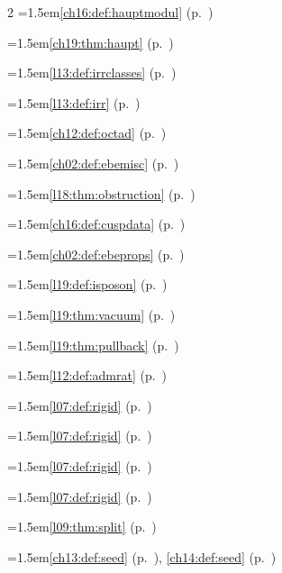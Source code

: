 \begin{multicols}{2}
\hangindent=1.5em\quad \ref{ch16:def:hauptmodul} (p.~\pageref{ch16:def:hauptmodul})\par
\hangindent=1.5em\quad \ref{ch19:thm:haupt} (p.~\pageref{ch19:thm:haupt})\par
\hangindent=1.5em\quad \ref{l13:def:irrclasses} (p.~\pageref{l13:def:irrclasses})\par
\hangindent=1.5em\quad \ref{l13:def:irr} (p.~\pageref{l13:def:irr})\par
\hangindent=1.5em\quad \ref{ch12:def:octad} (p.~\pageref{ch12:def:octad})\par
\hangindent=1.5em\quad \ref{ch02:def:ebemisc} (p.~\pageref{ch02:def:ebemisc})\par
\hangindent=1.5em\quad \ref{l18:thm:obstruction} (p.~\pageref{l18:thm:obstruction})\par
\hangindent=1.5em\quad \ref{ch16:def:cuspdata} (p.~\pageref{ch16:def:cuspdata})\par
\hangindent=1.5em\quad \ref{ch02:def:ebeprops} (p.~\pageref{ch02:def:ebeprops})\par
\hangindent=1.5em\quad \ref{l19:def:isposon} (p.~\pageref{l19:def:isposon})\par
\hangindent=1.5em\quad \ref{l19:thm:vacuum} (p.~\pageref{l19:thm:vacuum})\par
\hangindent=1.5em\quad \ref{l19:thm:pullback} (p.~\pageref{l19:thm:pullback})\par
\hangindent=1.5em\quad \ref{l12:def:admrat} (p.~\pageref{l12:def:admrat})\par
\hangindent=1.5em\quad \ref{l07:def:rigid} (p.~\pageref{l07:def:rigid})\par
\hangindent=1.5em\quad \ref{l07:def:rigid} (p.~\pageref{l07:def:rigid})\par
\hangindent=1.5em\quad \ref{l07:def:rigid} (p.~\pageref{l07:def:rigid})\par
\hangindent=1.5em\quad \ref{l07:def:rigid} (p.~\pageref{l07:def:rigid})\par
\hangindent=1.5em\quad \ref{l09:thm:split} (p.~\pageref{l09:thm:split})\par
\hangindent=1.5em\quad \ref{ch13:def:seed} (p.~\pageref{ch13:def:seed}), \ref{ch14:def:seed} (p.~\pageref{ch14:def:seed})\par

\end{multicols}
